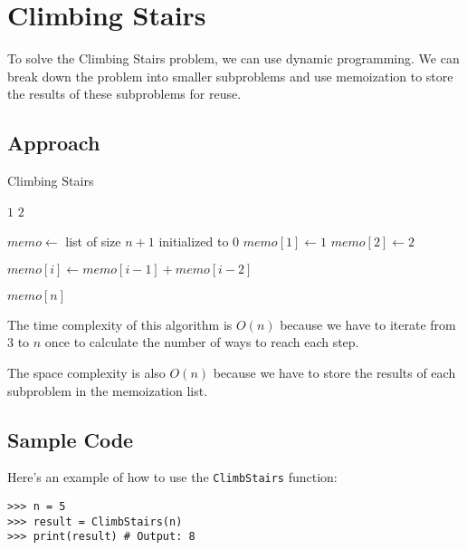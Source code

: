 \documentclass{article}
\begin{document}
\section*{Climbing Stairs}

To solve the Climbing Stairs problem, we can use dynamic programming. We can
break down the problem into smaller subproblems and use memoization to store the
results of these subproblems for reuse.

\subsection*{Approach}

\begin{algorithm}[H]
\caption{Climbing Stairs}
\begin{algorithmic}[1]
		\State \Return $1$
	\EndIf
		\State \Return $2$
	\EndIf

	\State $memo \gets$ list of size $n+1$ initialized to $0$
	\State $memo[1] \gets 1$
	\State $memo[2] \gets 2$

		\State $memo[i] \gets memo[i-1] + memo[i-2]$
	\EndFor

	\State \Return $memo[n]$

\EndFunction
\end{algorithmic}
\end{algorithm}

The time complexity of this algorithm is $O(n)$ because we have to iterate from
$3$ to $n$ once to calculate the number of ways to reach each step.

The space complexity is also $O(n)$ because we have to store the results of each
subproblem in the memoization list.

\subsection*{Sample Code}

Here's an example of how to use the \texttt{ClimbStairs} function:

\begin{verbatim}
>>> n = 5
>>> result = ClimbStairs(n)
>>> print(result) # Output: 8
\end{verbatim}
\end{document}
